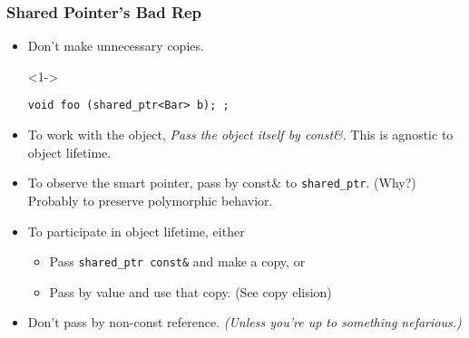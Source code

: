 \begin{frame}[fragile]
\frametitle{Shared Pointer's Bad Rep}
\begin{itemize}
\item<1-> Don't make unnecessary copies.
\item[]<1-> {\scriptsize\begin{verbatim}void foo (shared_ptr<Bar> b); ;\end{verbatim}}
\item<2-> To work with the object, \emph{Pass the object itself by
  const\&}.  This is agnostic to object lifetime.
\item<3-> To observe the smart pointer, pass by const\& to \texttt{shared\_ptr}. (Why?)
\note Probably to preserve polymorphic behavior.
\item<4-> To participate in object lifetime, either
  \begin{itemize}
    \item Pass \texttt{shared\_ptr const\&} and make a copy, or
    \item Pass by value and use that copy.  (See copy elision)
  \end{itemize}
\item<5-> Don't pass by non-const reference. \emph{(Unless you're up
  to something nefarious.)}
%
\end{itemize}
\end{frame}

